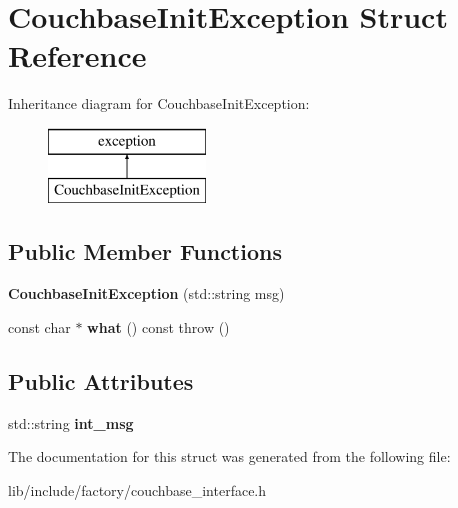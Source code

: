 \hypertarget{structCouchbaseInitException}{\section{Couchbase\-Init\-Exception Struct Reference}
\label{structCouchbaseInitException}
}
Inheritance diagram for Couchbase\-Init\-Exception\-:\begin{figure}[H]
\begin{center}
\leavevmode
\includegraphics[height=2.000000cm]{structCouchbaseInitException}
\end{center}
\end{figure}
\subsection*{Public Member Functions}
\begin{DoxyCompactItemize}
\item 
\hypertarget{structCouchbaseInitException_af820c10eb0b8bcd3db5c19a1047a89f4}{{\bfseries Couchbase\-Init\-Exception} (std\-::string msg)}\label{structCouchbaseInitException_af820c10eb0b8bcd3db5c19a1047a89f4}

\item 
\hypertarget{structCouchbaseInitException_a686ccc44a4ca9aad88a3f14005443b87}{const char $\ast$ {\bfseries what} () const   throw ()}\label{structCouchbaseInitException_a686ccc44a4ca9aad88a3f14005443b87}

\end{DoxyCompactItemize}
\subsection*{Public Attributes}
\begin{DoxyCompactItemize}
\item 
\hypertarget{structCouchbaseInitException_ae1ed6a38393bfadd2531266ef4834670}{std\-::string {\bfseries int\-\_\-msg}}\label{structCouchbaseInitException_ae1ed6a38393bfadd2531266ef4834670}

\end{DoxyCompactItemize}


The documentation for this struct was generated from the following file\-:\begin{DoxyCompactItemize}
\item 
lib/include/factory/couchbase\-\_\-interface.\-h\end{DoxyCompactItemize}
